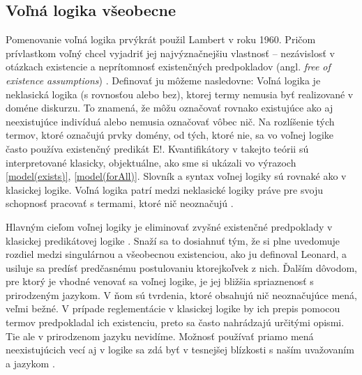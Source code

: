 \documentclass[12pt, letterpaper]{article}
\begin{document}
\subsection{Voľná logika všeobecne}
Pomenovanie voľná logika prvýkrát použil Lambert v roku 1960. Pričom prívlastkom voľný chcel vyjadriť jej najvýznačnejšiu vlastnosť -- nezávislosť v otázkach existencie a neprítomnosť existenčných predpokladov (angl. \textit{free of existence assumptions}) \parencites[123]{LambertPhi}.
Definovať ju môžeme nasledovne: Voľná logika je neklasická logika (s rovnosťou alebo bez), ktorej termy nemusia byť realizované v doméne diskurzu. To znamená, že môžu označovať rovnako existujúce ako aj neexistujúce indivíduá alebo nemusia označovať vôbec nič. Na rozlíšenie tých termov, ktoré označujú prvky domény, od tých, ktoré nie, sa vo voľnej logike často používa existenčný predikát $\text{E}!$. Kvantifikátory v takejto teórii sú interpretované klasicky, objektuálne, ako sme si ukázali vo výrazoch \ref{model(exists)}, \ref{model(forAll)}. Slovník a syntax voľnej logiky sú rovnaké ako v klasickej logike. Voľná logika patrí medzi neklasické logiky práve pre svoju schopnosť pracovať s termami, ktoré nič neoznačujú \parencites[9]{Bencivenga1990}[148]{Bencivenga2002}[1095]{bencivenga_jaskowski}[2]{Morscher2001}[1024]{Nolt2007}{sep-logic-free}[290]{Priest_2008}.\par




Hlavným cieľom voľnej logiky je eliminovať zvyšné existenčné predpoklady v klasickej predikátovej logike \parencites[123]{LambertPhi}[202]{Lehmann2002}[1]{Morscher2001}[290]{Priest_2008}. Snaží sa to dosiahnuť tým, že si plne uvedomuje rozdiel medzi singulárnou a všeobecnou existenciou, ako ju definoval Leonard, a usiluje sa predísť predčasnému postulovaniu ktorejkoľvek z nich. Ďalším dôvodom, pre ktorý je vhodné venovať sa voľnej logike, je jej bližšia spriaznenosť s prirodzeným jazykom. V ňom sú tvrdenia, ktoré obsahujú nič neoznačujúce mená, veľmi bežné. V prípade reglementácie v klasickej logike by ich prepis pomocou termov predpokladal ich existenciu, preto sa často nahrádzajú určitými opismi. Tie ale v prirodzenom jazyku nevidíme. Možnosť používať priamo mená neexistujúcich vecí aj v logike sa zdá byť v tesnejšej blízkosti s naším uvažovaním a jazykom \parencites[150]{Bencivenga2002}.\par
\end{document}
